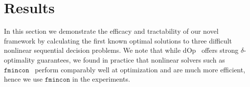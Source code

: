 \section{Results}
\label{sec:results}

In this section we demonstrate the efficacy and tractability of our novel framework by calculating the first known optimal solutions to three difficult nonlinear sequential decision problems.
We note that while dOp~\parencite{Gao2013} offers strong {\footnotesize $ \delta $}-optimality guarantees, we found in practice that nonlinear solvers such as $ \mathtt{fmincon} $~\parencite{MATLAB_2010} perform comparably well at optimization and are much more efficient, hence we use $ \mathtt{fmincon} $ in the experiments.

